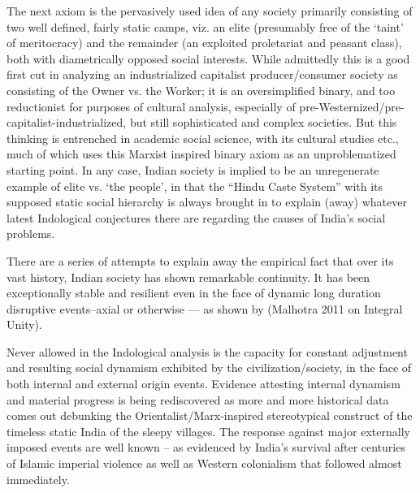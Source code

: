 The next axiom is the pervasively used idea of any society primarily consisting of two well defined, fairly static camps, viz. an elite (presumably free of the ‘taint’ of meritocracy) and the remainder (an exploited proletariat and peasant class), both with diametrically opposed social interests. While admittedly this is a good first cut in analyzing an industrialized capitalist producer/consumer society as consisting of the Owner vs. the Worker; it is an oversimplified binary, and too reductionist for purposes of cultural analysis, especially of pre-Westernized/pre-capitalist-industrialized, but still sophisticated and complex societies. But this thinking is entrenched in academic social science, with its cultural studies etc., much of which uses this Marxist inspired binary axiom as an unproblematized starting point. In any case, Indian society is implied to be an unregenerate example of elite vs. ‘the people’, in that the “Hindu Caste System” with its supposed static social hierarchy is always brought in to explain (away) whatever latest Indological conjectures there are regarding the causes of India’s social problems.

There are a series of attempts to explain away the empirical fact that over its vast history, Indian society has shown remarkable continuity. It has been exceptionally stable and resilient even in the face of dynamic long duration disruptive events--axial or otherwise --- as shown by (Malhotra 2011 on Integral Unity).

Never allowed in the Indological analysis is the capacity for constant adjustment and resulting social dynamism exhibited by the civilization/society, in the face of both internal and external origin events. Evidence attesting internal dynamism and material progress is being rediscovered as more and more historical data comes out debunking the Orientalist/Marx-inspired stereotypical construct of the timeless static India of the sleepy villages. The response against major externally imposed events are well known -- as evidenced by India’s survival after centuries of Islamic imperial violence as well as Western colonialism that followed almost immediately.


